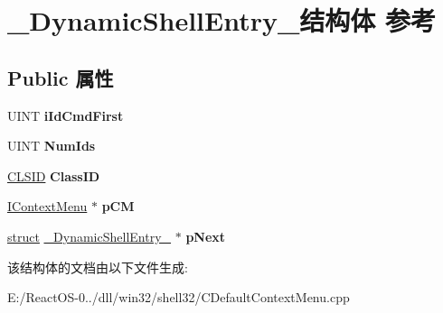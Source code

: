 \hypertarget{struct___dynamic_shell_entry__}{}\section{\+\_\+\+Dynamic\+Shell\+Entry\+\_\+结构体 参考}
\label{struct___dynamic_shell_entry__}
\subsection*{Public 属性}
\begin{DoxyCompactItemize}
\item 
\mbox{\label{struct___dynamic_shell_entry___a076825ba73ce4c2cd7d9410f4ea689a6}} 
U\+I\+NT {\bfseries i\+Id\+Cmd\+First}
\item 
\mbox{\label{struct___dynamic_shell_entry___a8f27c951db70272a0f404999d2db375a}} 
U\+I\+NT {\bfseries Num\+Ids}
\item 
\mbox{\label{struct___dynamic_shell_entry___ab2c259c0d8b62f5ab07edfcb6d2226f6}} 
\hyperlink{struct___i_i_d}{C\+L\+S\+ID} {\bfseries Class\+ID}
\item 
\mbox{\label{struct___dynamic_shell_entry___a02722af4c4f1181c7f73d19a41f35609}} 
\hyperlink{interface_i_context_menu}{I\+Context\+Menu} $\ast$ {\bfseries p\+CM}
\item 
\mbox{\label{struct___dynamic_shell_entry___a54d403a18c5cbc9869519e8ee18e1a05}} 
\hyperlink{interfacestruct}{struct} \hyperlink{struct___dynamic_shell_entry__}{\+\_\+\+Dynamic\+Shell\+Entry\+\_\+} $\ast$ {\bfseries p\+Next}
\end{DoxyCompactItemize}


该结构体的文档由以下文件生成\+:\begin{DoxyCompactItemize}
\item 
E\+:/\+React\+O\+S-\/0../dll/win32/shell32/C\+Default\+Context\+Menu.\+cpp\end{DoxyCompactItemize}
